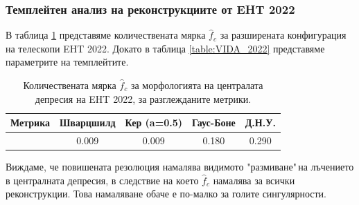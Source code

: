 \subsubsection{Темплейтен анализ на реконструкциите от EHT 2022}

В таблица \ref{table:f_2022} представяме количествената мярка $\hat{f}_c$ за разширената конфигурация на телескопи EHT 2022. Докато в таблица \ref{table:VIDA_2022} представяме параметрите на темплейтите.

\begin{table}[h!]
	\centering
	\begin{tabular}{||c|c|c|c|c||}
		\hline
		{Метрика} & {Шварцшилд}&{Кер (a=0.5)}&{Гаус-Боне}&{Д.Н.У.}
		\\\hline
		{\thead{$\hat{f}_c$}} & 0.009&0.009&0.180&0.290
		\\\hline
	\end{tabular}
	\caption[Количествената мярка $\hat{f}_c$ за морфологията на централата депресия на EHT 2022]{Количествената мярка $\hat{f}_c$ за морфологията на централата депресия на EHT 2022, за разглежданите метрики.}
	\label{table:f_2022}
\end{table}
Виждаме, че повишената резолюция намалява видимото "размиване"$\,$на лъчението в централната депресия, в следствие на което $\hat{f}_c$ намалява за всички реконструкции. Това намаляване обаче е по-малко за голите сингулярности. 
